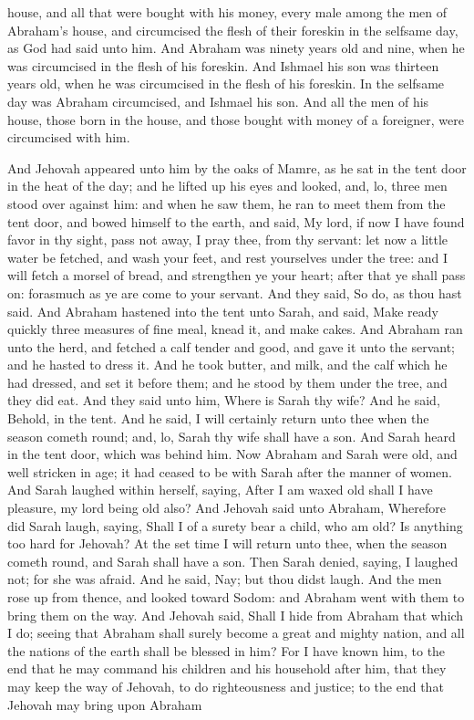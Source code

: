 house, and all that were bought with his money, every male among the men of Abraham’s house, and circumcised the flesh of their foreskin in the selfsame day, as God had said unto him. And Abraham was ninety years old and nine, when he was circumcised in the flesh of his foreskin. And Ishmael his son was thirteen years old, when he was circumcised in the flesh of his foreskin. In the selfsame day was Abraham circumcised, and Ishmael his son. And all the men of his house, those born in the house, and those bought with money of a foreigner, were circumcised with him. 

And Jehovah appeared unto him by the oaks of Mamre, as he sat in the tent door in the heat of the day; and he lifted up his eyes and looked, and, lo, three men stood over against him: and when he saw them, he ran to meet them from the tent door, and bowed himself to the earth, and said, My lord, if now I have found favor in thy sight, pass not away, I pray thee, from thy servant: let now a little water be fetched, and wash your feet, and rest yourselves under the tree: and I will fetch a morsel of bread, and strengthen ye your heart; after that ye shall pass on: forasmuch as ye are come to your servant. And they said, So do, as thou hast said. And Abraham hastened into the tent unto Sarah, and said, Make ready quickly three measures of fine meal, knead it, and make cakes. And Abraham ran unto the herd, and fetched a calf tender and good, and gave it unto the servant; and he hasted to dress it. And he took butter, and milk, and the calf which he had dressed, and set it before them; and he stood by them under the tree, and they did eat.  And they said unto him, Where is Sarah thy wife? And he said, Behold, in the tent. And he said, I will certainly return unto thee when the season cometh round; and, lo, Sarah thy wife shall have a son. And Sarah heard in the tent door, which was behind him. Now Abraham and Sarah were old, and well stricken in age; it had ceased to be with Sarah after the manner of women. And Sarah laughed within herself, saying, After I am waxed old shall I have pleasure, my lord being old also? And Jehovah said unto Abraham, Wherefore did Sarah laugh, saying, Shall I of a surety bear a child, who am old? Is anything too hard for Jehovah? At the set time I will return unto thee, when the season cometh round, and Sarah shall have a son. Then Sarah denied, saying, I laughed not; for she was afraid. And he said, Nay; but thou didst laugh.  And the men rose up from thence, and looked toward Sodom: and Abraham went with them to bring them on the way. And Jehovah said, Shall I hide from Abraham that which I do; seeing that Abraham shall surely become a great and mighty nation, and all the nations of the earth shall be blessed in him? For I have known him, to the end that he may command his children and his household after him, that they may keep the way of Jehovah, to do righteousness and justice; to the end that Jehovah may bring upon Abraham 